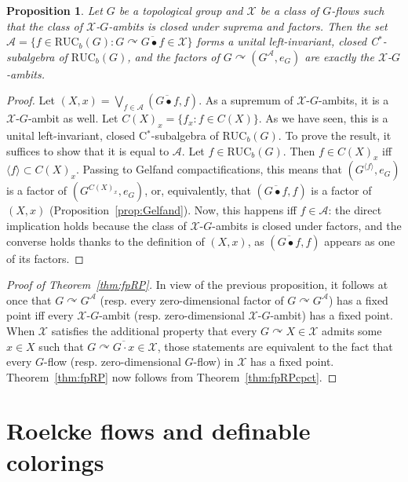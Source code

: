 \documentclass[11pt]{article}
\newtheorem{prop}[theo]{Proposition}
\theoremstyle{definition}
\numberwithin{equation}{section}
\numberwithin{figure}{section}
\numberwithin{table}{section}
\newcommand{\A}{\mathcal A}
\newcommand{\actson}{\curvearrowright}
\newcommand{\RUCB}{\mathrm{RUC}_{b}}
\begin{document}
\begin{prop}\label{prop:KA}
Let $G$ be a topological group and $\mathcal X$ be a class of $G$-flows such that the class of $\mathcal X$-$G$-ambits is closed under suprema and factors. Then the set $\A=\{ f\in \RUCB(G) : G\actson \overline{G\bullet f} \in \mathcal X\}$ forms a unital left-invariant, closed C$^{*}$-subalgebra of $\RUCB(G)$, and the factors of $G\actson(G^{\A}, e_{G})$ are exactly the $\mathcal X$-$G$-ambits.
\end{prop}

\begin{proof}
Let $(X,x)=\bigvee_{f\in \A}(\overline{G\bullet f},f)$. As a supremum of $\mathcal X$-$G$-ambits, it is a $\mathcal X$-$G$-ambit as well. Let $C(X)_{x} = \{ f_{x}:f\in C(X)\}$. As we have seen, this is a unital left-invariant, closed C$^{*}$-subalgebra of $\RUCB(G)$. To prove the result, it suffices to show that it is equal to $\A$. Let $f\in \RUCB(G)$. Then $f\in C(X)_{x}$ iff $\langle f\rangle \subset C(X)_{x}$. Passing to Gelfand compactifications, this means that $(G^{\langle f \rangle},e_{G})$ is a factor of $(G^{C(X)_{x}},e_{G})$, or, equivalently, that $(\overline{G\bullet f},f)$ is a factor of $(X,x)$ (Proposition~\ref{prop:Gelfand}). Now, this happens iff $f\in \A$: the direct implication holds because the class of $\mathcal X$-$G$-ambits is closed under factors, and the converse holds thanks to the definition of $(X,x)$, as $(\overline{G\bullet f},f)$ appears as one of its factors.
\end{proof}

\begin{proof}[Proof of Theorem~\ref{thm:fpRP}]\label{proofofthm}
In view of the previous proposition, it follows at once that $G\actson G^{\A}$ (resp. every zero-dimensional factor of $G\actson G^{\A}$) has a fixed point iff every $\mathcal X$-$G$-ambit (resp. zero-dimensional $\mathcal X$-$G$-ambit) has a fixed point. When $\mathcal X$ satisfies the additional property that every $G\actson X\in \mathcal X$ admits some $x\in X$ such that $G\actson \overline{G\cdot x}\in \mathcal X$, those statements are equivalent to the fact that every $G$-flow (resp. zero-dimensional $G$-flow) in $\mathcal X$ has a fixed point. Theorem~\ref{thm:fpRP} now follows from Theorem~\ref{thm:fpRPcpct}.
\end{proof}

\section{Roelcke flows and definable colorings}
\label{section:Roelcke}
\end{document}
